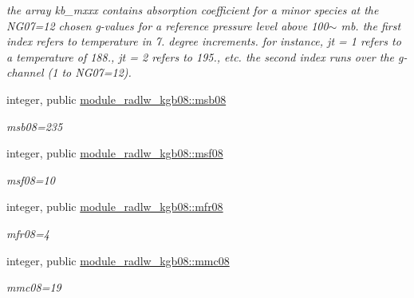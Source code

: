 \begin{DoxyCompactItemize}
\begin{DoxyCompactList}\small\item\em the array kb\+\_\+mxxx contains absorption coefficient for a minor species at the N\+G07=12 chosen g-\/values for a reference pressure level above 100$\sim$ mb. the first index refers to temperature in 7. degree increments. for instance, jt = 1 refers to a temperature of 188., jt = 2 refers to 195., etc. the second index runs over the g-\/channel (1 to N\+G07=12). \end{DoxyCompactList}\item 
\mbox{\label{group__module__radlw__kgbnn_ga3dd391fcce47d3aca3512bbfd946807b}} 
integer, public \hyperlink{group__module__radlw__kgbnn_ga3dd391fcce47d3aca3512bbfd946807b}{module\+\_\+radlw\+\_\+kgb08\+::msb08}
\begin{DoxyCompactList}\small\item\em msb08=235 \end{DoxyCompactList}\item 
\mbox{\label{group__module__radlw__kgbnn_ga7db22d5a0ece1b1f10cbf64ae1181a09}} 
integer, public \hyperlink{group__module__radlw__kgbnn_ga7db22d5a0ece1b1f10cbf64ae1181a09}{module\+\_\+radlw\+\_\+kgb08\+::msf08}
\begin{DoxyCompactList}\small\item\em msf08=10 \end{DoxyCompactList}\item 
\mbox{\label{group__module__radlw__kgbnn_gabfaf0cad62f8ae42564f8127198d48f0}} 
integer, public \hyperlink{group__module__radlw__kgbnn_gabfaf0cad62f8ae42564f8127198d48f0}{module\+\_\+radlw\+\_\+kgb08\+::mfr08}
\begin{DoxyCompactList}\small\item\em mfr08=4 \end{DoxyCompactList}\item 
\mbox{\label{group__module__radlw__kgbnn_ga9e3bfc1880221c18fa07817eb62bcc47}} 
integer, public \hyperlink{group__module__radlw__kgbnn_ga9e3bfc1880221c18fa07817eb62bcc47}{module\+\_\+radlw\+\_\+kgb08\+::mmc08}
\begin{DoxyCompactList}\small\item\em mmc08=19 \end{DoxyCompactList}\item 

\end{DoxyCompactItemize}
